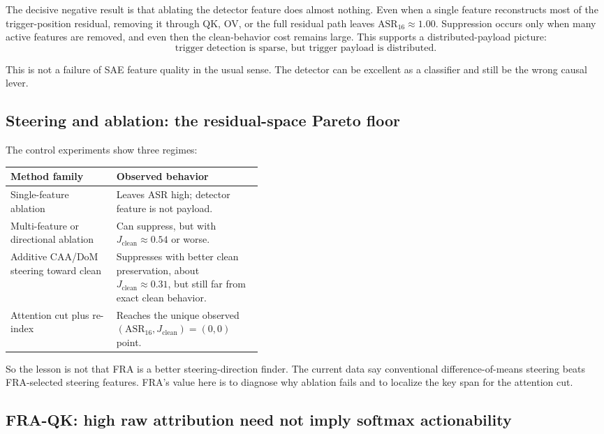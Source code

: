\documentclass[11pt]{article}
\newcommand{\ASR}{\mathrm{ASR}_{16}}
\newcommand{\Jclean}{J_{\mathrm{clean}}}
\theoremstyle{definition}
\theoremstyle{plain}
\theoremstyle{remark}
\begin{document}
The decisive negative result is that ablating the detector feature does almost
nothing.  Even when a single feature reconstructs most of the trigger-position
residual, removing it through QK, OV, or the full residual path leaves $\ASR\approx
1.00$.  Suppression occurs only when many active features are removed, and even
then the clean-behavior cost remains large.  This supports a distributed-payload
picture:
\[
\text{trigger detection is sparse, but trigger payload is distributed.}
\]

This is not a failure of SAE feature quality in the usual sense.  The detector
can be excellent as a classifier and still be the wrong causal lever.

\subsection{Steering and ablation: the residual-space Pareto floor}

The control experiments show three regimes:
\begin{center}
\begin{tabularx}{0.92\linewidth}{L{0.42\linewidth}Y}
\toprule
Method family & Observed behavior \\
\midrule
Single-feature ablation & Leaves ASR high; detector feature is not payload. \\
Multi-feature or directional ablation & Can suppress, but with $\Jclean\approx 0.54$ or worse. \\
Additive CAA/DoM steering toward clean & Suppresses with better clean preservation, about $\Jclean\approx 0.31$, but still far from exact clean behavior. \\
Attention cut plus re-index & Reaches the unique observed $(\ASR,\Jclean)=(0,0)$ point. \\
\bottomrule
\end{tabularx}
\end{center}

So the lesson is not that FRA is a better steering-direction finder.  The current
data say conventional difference-of-means steering beats FRA-selected steering
features.  FRA's value here is to diagnose why ablation fails and to localize the
key span for the attention cut.

\subsection{FRA-QK: high raw attribution need not imply softmax actionability}
\end{document}
